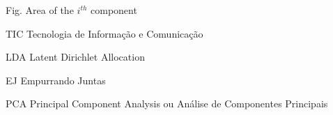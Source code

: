 \begin{siglas}
  \item[Fig.] Area of the $i^{th}$ component
  \item[TIC] Tecnologia de Informação e Comunicação
  \item[LDA] Latent Dirichlet Allocation
  \item[EJ] Empurrando Juntas
  \item[PCA] Principal Component Analysis ou Análise de Componentes Principais
\end{siglas}
